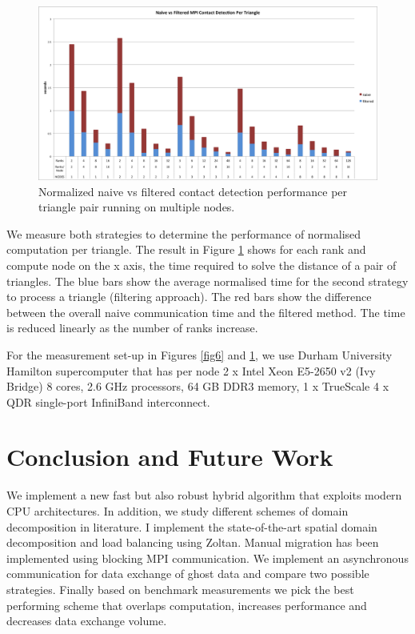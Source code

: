 \documentclass[times,12pt]{article}
\begin{document}
\begin{figure}[!h]
\centering
\includegraphics[width=1\textwidth]{mpi} \protect\caption{\label{fig7}Normalized naive vs filtered contact detection performance per triangle pair running on multiple nodes.}
\end{figure}

We measure both strategies to determine the performance of normalised computation per triangle. The result in Figure \ref{fig7} shows for each rank and compute node on the x axis, the time required to solve the distance of a pair of triangles. The blue bars show the average normalised time for the second strategy to process a triangle (filtering approach). The red bars show the difference between the overall naive communication time and the filtered method. The time is reduced linearly as the number of ranks increase.

For the measurement set-up in Figures \ref{fig6} and \ref{fig7}, we use Durham University Hamilton supercomputer that has per node 2 x Intel Xeon E5-2650 v2 (Ivy Bridge) 8 cores, 2.6 GHz processors, 64 GB DDR3 memory, 1 x TrueScale 4 x QDR single-port InfiniBand interconnect. 

\section{Conclusion and Future Work}

We implement a new fast but also robust hybrid algorithm that exploits modern CPU architectures. In addition, we study different schemes of domain decomposition in literature. I implement the state-of-the-art spatial domain decomposition and load balancing using Zoltan. Manual migration has been implemented using blocking MPI communication. We implement an asynchronous communication for data exchange of ghost data and compare two possible strategies. Finally based on benchmark measurements we pick the best performing scheme that overlaps computation, increases performance and decreases data exchange volume.
\end{document}
